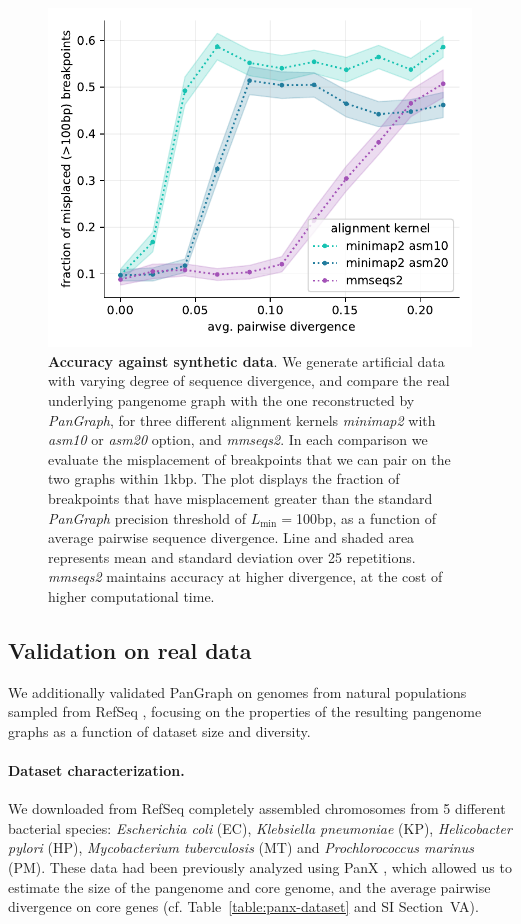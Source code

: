 \documentclass[aps,rmp,preprint,superscriptaddress,10pt,linenumbers]{revtex4-1}
\newcommand{\Lthr}{L_{\min}}
\newcommand{\SIdataBenchmark}{V}
\begin{document}
\begin{figure}[tb]
    \includegraphics[width=.4\textwidth]{figs/misplaced_fraction_vs_divergence.pdf}
    \caption{{\bf Accuracy against synthetic data}.
        We generate artificial data with varying degree of sequence divergence, and compare the real underlying pangenome graph with the one reconstructed by \textit{PanGraph}, for three different alignment kernels \textit{minimap2} with \textit{asm10} or \textit{asm20} option, and \textit{mmseqs2}. In each comparison we evaluate the misplacement of breakpoints that we can pair on the two graphs within 1kbp. The plot displays the fraction of breakpoints that have misplacement greater than the standard \textit{PanGraph} precision threshold of $\Lthr=$100bp, as a function of average pairwise sequence divergence. Line and shaded area represents mean and standard deviation over 25 repetitions. \textit{mmseqs2} maintains accuracy at higher divergence, at the cost of higher computational time.
    }
    \label{fig:toy-accuracy}
\end{figure}


\subsection{Validation on real data}

We additionally validated PanGraph on genomes from natural populations sampled from RefSeq \cite{o2016reference}, focusing on the properties of the resulting pangenome graphs as a function of dataset size and diversity.

\paragraph*{Dataset characterization.}
We downloaded from RefSeq \cite{o2016reference} completely assembled chromosomes from 5 different bacterial species: \textit{Escherichia coli} (EC), \textit{Klebsiella pneumoniae} (KP), \textit{Helicobacter pylori} (HP), \textit{Mycobacterium tuberculosis} (MT) and \textit{Prochlorococcus marinus} (PM). These data had been previously analyzed using PanX \cite{ding2018panx}, which allowed us to estimate the size of the pangenome and core genome, and the average pairwise divergence on core genes (cf. Table~\ref{table:panx-dataset} and SI Section~{\SIdataBenchmark}A).
\end{document}
